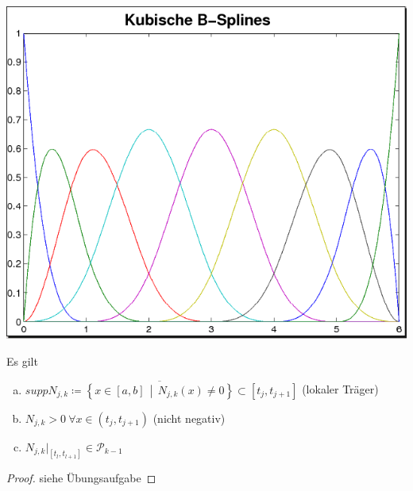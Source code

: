 {  \includegraphics[width=\linewidth]{images/kubBsplines.png}
}

\begin{Kore}
  Es gilt
  \begin{enumerate}[a)]
  \item $supp N_{j,k} \coloneqq 
    \overline{\left\{ x\in[a,b]\,\middle\vert
        \, N_{j,k}(x)\neq 0\right\}} \subset [t_j, t_{j+1}]$
    (lokaler Träger)
  \item $N_{j,k}>0 ~\forall x\in(t_j,t_{j+1})$ (nicht negativ)
  \item $N_{j,k}\vert_{[t_l,t_{l+1}]}\in \mathcal{P}_{k-1}$
  \end{enumerate}

  \begin{proof}
    siehe Übungsaufgabe
  \end{proof}
\end{Kore}

